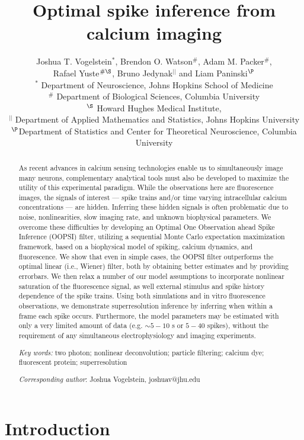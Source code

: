 \documentclass[12pt]{article}
\title{Optimal spike inference from calcium imaging}%
\author{Joshua T. Vogelstein$^\ast$, Brendon O. Watson$^\#$,  Adam M. Packer$^\#$, \\ Rafael Yuste$^{\#\S}$, Bruno Jedynak$^{||}$ and Liam Paninski$^\P$ \\  $^\ast$ Department of Neuroscience, Johns Hopkins School of Medicine \\ $^\#$ Department of Biological Sciences, Columbia University \\ $^\S$ Howard Hughes Medical Institute, \\
$^{||}$ Department of Applied Mathematics and Statistics, Johns Hopkins University \\
 $^\P$Department of Statistics and Center for Theoretical Neuroscience, Columbia University}
\begin{document}
\maketitle
\begin{abstract}

As recent advances in calcium sensing technologies enable us to simultaneously image many neurons, complementary analytical tools must also be developed to maximize the utility of this experimental paradigm. While the observations here are fluorescence images, the signals of interest --- spike trains and/or time varying intracellular calcium concentrations --- are hidden.  Inferring these hidden signals is often problematic due to noise, nonlinearities, slow imaging rate, and unknown biophysical parameters. We overcome these difficulties by developing an Optimal One Observation ahead Spike Inference (OOPSI) filter, utilizing a sequential Monte Carlo expectation maximization framework, based on a biophysical model of spiking, calcium dynamics, and fluorescence.  We show that even in simple cases, the OOPSI filter outperforms the optimal linear (i.e., Wiener) filter, both by obtaining better estimates and by providing errorbars. We then relax a number of our model assumptions to incorporate nonlinear saturation of the fluorescence signal, as well external stimulus and spike history dependence of the spike trains.  Using both simulations and in vitro fluorescence observations, we demonstrate superresolution inference by inferring when within a frame each spike occurs. Furthermore, the model parameters may be estimated with only a very limited amount of data (e.g. $\sim 5-10$ s or $5-40$ spikes), without the requirement of any simultaneous electrophysiology and imaging experiments.


\emph{Key words:} two photon; nonlinear deconvolution; particle filtering; calcium dye; fluorescent protein; superresolution 

\emph{Corresponding author}: Joshua Vogelstein, joshuav@jhu.edu

\end{abstract}

\newpage
\pagestyle{myheadings}

\section*{Introduction}
\end{document}
